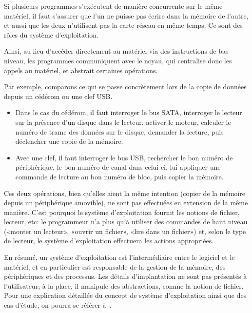 Si plusieurs programmes s'exécutent de manière concurrente sur le même matériel,
il faut s'assurer que l'un ne puisse pas écrire dans la mémoire de l'autre, et
aussi que les deux n'utilisent pas la carte réseau en même temps. Ce sont des
rôles du système d'exploitation.

Ainsi, au lieu d'accéder directement au matériel via des instructions de bas
niveau, les programmes communiquent avec le noyau, qui centralise donc les
appels au matériel, et abstrait certaines opérations.

Par exemple, comparons ce qui se passe concrètement lors de la copie de données
depuis un cédérom ou une clef USB.\@

\begin{itemize}

  \item Dans le cas du cédérom, il faut interroger le bus SATA, interroger le
    lecteur sur la présence d'un disque dans le lecteur, activer le moteur,
    calculer le numéro de trame des données sur le disque, demander la lecture,
    puis déclencher une copie de la mémoire.

  \item Avec une clef, il faut interroger le bus USB, rechercher le bon numéro
    de périphérique, le bon numéro de canal dans celui-ci, lui appliquer une
    commande de lecture au bon numéro de bloc, puis copier la mémoire.

\end{itemize}

Ces deux opérations, bien qu'elles aient la même intention (copier de la mémoire
depuis un périphérique amovible), ne sont pas effectuées en extension de la même
manière. C'est pourquoi le système d'exploitation fournit les notions de
fichier, lecteur, etc: le programmeur n'a plus qu'à utiliser des commandes de
haut niveau («monter un lecteur», «ouvrir un fichier», «lire dans un
fichier») et, selon le type de lecteur, le système d'exploitation effectuera les
actions appropriées.

En résumé, un système d'exploitation est l'intermédiaire entre le logiciel et le
matériel, et en particulier est responsable de la gestion de la mémoire, des
périphériques et des processus. Les détails d'implantation ne sont pas présentés
à l'utilisateur; à la place, il manipule des abstractions, comme la notion de
fichier. Pour une explication détaillée du concept de système d'exploitation
ainsi que des cas d'étude, on pourra se référer à~\cite{tanenbaum}.

